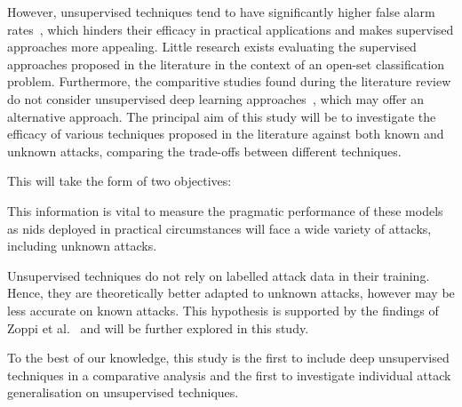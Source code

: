 However, unsupervised techniques tend to have significantly higher false alarm
rates~\cite{}, which hinders their efficacy in practical applications and makes
supervised approaches more appealing. Little research exists evaluating the
supervised approaches proposed in the literature in the context of an open-set
classification problem. Furthermore, the comparitive studies found during the
literature review do not consider unsupervised deep learning
approaches~\cite{}, which may offer an alternative approach. The principal aim
of this study will be to investigate the efficacy of various techniques
proposed in the literature against both known and unknown attacks, comparing
the trade-offs between different techniques.%

This will take the form of two objectives:

\hypertarget{obj}{}

\begin{center}
\end{center}

This information is vital to measure the pragmatic performance of these models
as \gls{nids} deployed in practical circumstances will face a wide variety of
attacks, including unknown attacks.

\begin{center}
\end{center}

Unsupervised techniques do not rely on labelled attack data in their training.
Hence, they are theoretically better adapted to unknown attacks, however may be
less accurate on known attacks. This hypothesis is supported by the findings of
Zoppi et al.~\cite{Zoppi} and will be further explored in this study.

To the best of our knowledge, this study is the first to include deep
unsupervised techniques in a comparative analysis and the first to investigate
individual attack generalisation on unsupervised techniques.

